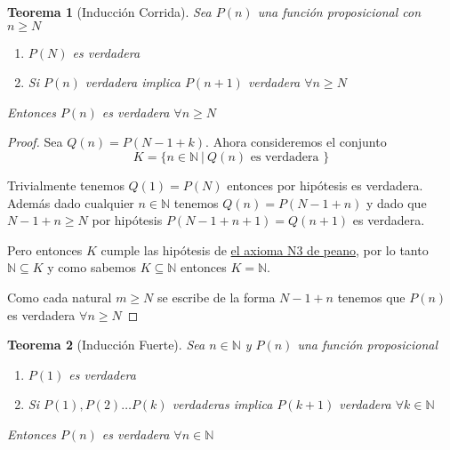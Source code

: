 \documentclass{article}
\theoremstyle{break}
\newtheorem{theorem}{Teorema}[section]
\def \N{\mathbb{N}}
\begin{document}
    \begin{tcolorbox}\label{sec:corrida}
        \begin{theorem}[Inducción Corrida]
            Sea $P(n)$ una función proposicional con $n \geq N$
            \begin{enumerate}
                \item $P(N)$ es verdadera
                \item Si $P(n)$ verdadera implica $P(n+1)$ verdadera $\forall n \geq N$
            \end{enumerate}

            Entonces $P(n)$ es verdadera $\forall n \geq N$
        \end{theorem}    
    \end{tcolorbox}

    \begin{proof}
        Sea $Q(n) = P(N -1 + k)$. Ahora consideremos el conjunto $$ K = \{n \in\N \ |\ Q(n) \text{ es verdadera }\}$$
        
        \noindent Trivialmente tenemos $Q(1) = P(N)$ entonces por hipótesis es verdadera. Además dado cualquier $n\in\N$ tenemos $Q(n) = P(N-1+n)$ y dado que $N-1 + n \geq N$
        por hipótesis $P(N-1+n+1) = Q(n+1)$ es verdadera.

        Pero entonces $K$ cumple las hipótesis de \hyperref[sec:Peano]{el axioma N3 de peano}, por lo tanto $\N\subseteq K$ y como sabemos $K \subseteq\N$
        entonces $K = \N$. 
        
        Como cada natural $m \geq N$ se escribe de la forma $N - 1 + n$ tenemos que $P(n)$ es verdadera $\forall n \geq N$
    \end{proof}

    \begin{tcolorbox}\label{sec:fuerte}
        \begin{theorem}[Inducción Fuerte]
            Sea $n\in\N$ y $P(n)$ una función proposicional
            \begin{enumerate}
                \item $P(1)$ es verdadera
                \item Si $P(1),P(2)\ldots P(k)$ verdaderas implica $P(k+1)$ verdadera $\forall k \in \N$
            \end{enumerate}

            Entonces $P(n)$ es verdadera $\forall n \in \N$
        \end{theorem}    
    \end{tcolorbox}
\end{document}
